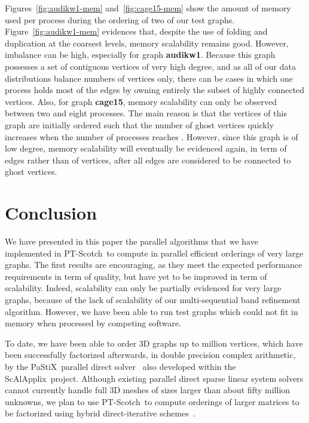 \documentclass[fleqn,12pt,twoside]{article}
\newcommand{\pastix}{{\sc PaStiX}}               \newcommand{\libscotch}{{\sc libScotch}}         \newcommand{\scotch}{{\sc Scotch}}               \newcommand{\ptscotch}{{\sc PT-Scotch}}          \newcommand{\scalapplix}{{\sc ScAlApplix}}
\begin{document}
Figures~\ref{fig:audikw1-mem} and~\ref{fig:cage15-mem} show the amount
of memory used per process during the ordering of two of our test
graphs. Figure~\ref{fig:audikw1-mem} evidences that, despite the use
of folding and duplication at the coarsest levels, memory scalability
remains good. However, imbalance can be high, especially for graph
\textbf{audikw1}. Because this graph possesses a set of contiguous
vertices of very high degree, and as all of our data distributions
balance numbers of vertices only, there can be cases in which one
process holds most of the edges by owning entirely the subset of
highly connected vertices. Also, for graph \textbf{cage15}, memory
scalability can only be observed between two and eight processes. The
main reason is that the vertices of this graph are initially ordered
such that the number of ghost vertices quickly increases when the
number of processes reaches . However, since this graph is of low
degree, memory scalability will eventually be evidenced again, in term
of edges rather than of vertices, after all edges are considered to be
connected to ghost vertices.



\section{Conclusion}
\label{secconcl}

We have presented in this paper the parallel algorithms that we have
implemented in \ptscotch\ to compute in parallel efficient orderings
of very large graphs. The first results are encouraging, as they meet
the expected performance requirements in term of quality, but have yet
to be improved in term of scalability. Indeed, scalability can only be
partially evidenced for very large graphs, because of the lack of
scalability of our multi-sequential band refinement algorithm.
However, we have been able to run test graphs which could not fit in
memory when processed by competing software.

To date, we have been able to order 3D graphs up to  million
vertices, which have been successfully factorized afterwards, in double
precision complex arithmetic, by the \pastix\ parallel direct
solver~\cite{heraro05} also developed within the \scalapplix\ project.
Although existing parallel direct sparse linear system
solvers cannot currently handle full 3D meshes of sizes larger than
about fifty million unknowns, we plan to use \ptscotch\ to compute
orderings of larger matrices to be factorized using hybrid
direct-iterative schemes~\cite{hesa06,heraro07}.
\\
\end{document}
